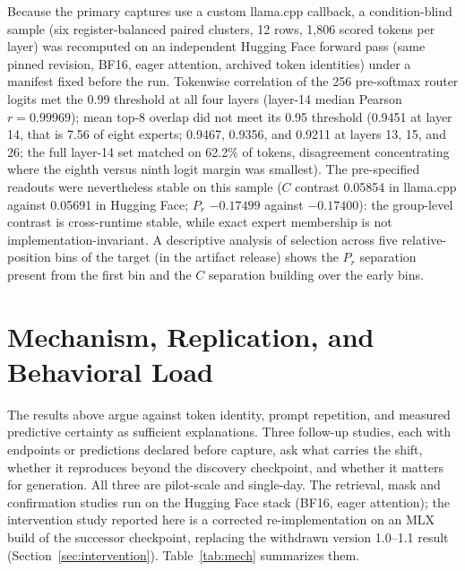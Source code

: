 \documentclass[10pt,a4paper,twocolumn]{article}
\begin{document}
Because the primary captures use a custom llama.cpp callback, a
condition-blind sample (six register-balanced paired clusters, 12 rows, 1,806
scored tokens per layer) was recomputed on an independent Hugging Face forward
pass (same pinned revision, BF16, eager attention, archived token identities)
under a manifest fixed before the run. Tokenwise correlation of the 256
pre-softmax router logits met the 0.99 threshold at all four layers (layer-14
median Pearson \(r=0.99969\)); mean top-8 overlap did not meet its 0.95
threshold (0.9451 at layer 14, that is 7.56 of eight experts; 0.9467, 0.9356,
and 0.9211 at layers 13, 15, and 26; the full layer-14 set matched on 62.2\%
of tokens, disagreement concentrating where the eighth
versus ninth logit margin was smallest). The pre-specified readouts were
nevertheless stable on this sample (\(C\) contrast 0.05854 in llama.cpp
against 0.05691 in Hugging Face; \(P_r\) \(-0.17499\) against \(-0.17400\)):
the group-level contrast is cross-runtime stable, while exact expert
membership is not implementation-invariant. A descriptive analysis of
selection across five relative-position bins of the target (in the artifact
release) shows the \(P_r\) separation present from the first bin and the
\(C\) separation building over the early bins.

\section{Mechanism, Replication, and Behavioral Load}\label{sec:mechanism}

The results above argue against token identity, prompt repetition, and
measured predictive certainty as sufficient explanations. Three follow-up
studies, each with endpoints or predictions declared before capture, ask what
carries the shift, whether it reproduces beyond the discovery checkpoint, and
whether it matters for generation. All three are pilot-scale and single-day.
The retrieval, mask and confirmation studies run on the Hugging Face stack
(BF16, eager attention); the intervention study reported here is a
corrected re-implementation on an MLX build of the successor checkpoint,
replacing the withdrawn version 1.0--1.1 result
(Section~\ref{sec:intervention}). Table~\ref{tab:mech} summarizes them.
\end{document}
